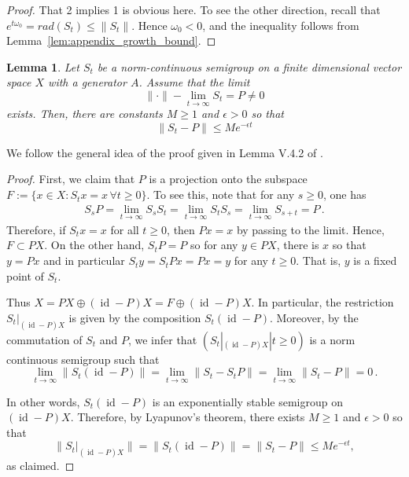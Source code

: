 \documentclass{article}
\DeclareMathOperator{\id}{id}
\newcommand{\<}{\langle}
\renewcommand{\>}{\rangle}
\numberwithin{equation}{section}
\newtheorem{lem}[thm]{Lemma}
\theoremstyle{definition}
\begin{document}
\begin{proof} 
	That 2 implies 1 is obvious here. To see the other direction, recall that $e^{t\omega_0} = rad(S_t) \le \|S_t\|$. Hence $\omega_0<0$, and the inequality follows from Lemma~\ref{lem:appendix_growth_bound}.
\end{proof}

\begin{lem}\label{lem:exp_decay}
	Let $S_t$ be a norm-continuous semigroup on a finite dimensional vector space $X$ with a generator $A$. Assume that the limit
		\begin{equation}
			\|\cdot \|-\lim_{t\to \infty} S_t = P \neq 0
		\end{equation} exists. Then, there are constants $M\ge 1$ and $\epsilon >0$ so that 
		\begin{equation}
			\|S_t - P\| \le M e^{-\epsilon t}
		\end{equation}
\end{lem}

	We follow the general idea of the proof given in Lemma V.4.2 of \cite{EngelNagel_Short}. 
\begin{proof}
	First, we claim that $P$ is a projection onto the subspace $F:=\{x\in X \colon S_tx = x \, \forall t\ge 0\}$. To see this, note that for any $s\ge 0$, one has 
	\begin{align*}
		S_s P = \lim_{t\to \infty} S_s S_t = \lim_{t\to \infty} S_{t}S_s = \lim_{t\to \infty} S_{s+t} = P\,.
	\end{align*} Therefore, if $S_tx = x$ for all $t\ge 0$, then $Px = x$ by passing to the limit. Hence, $F\subset PX$. On the other hand, $S_tP = P$ so for any $y\in PX$, there is $x$ so that $y= Px$ and in particular $S_t y = S_t Px = Px = y$ for any $t\ge 0$. That is, $y$ is a fixed point of $S_t$. 
	
	Thus $X = PX \oplus (\id - P)X = F\oplus (\id-P)X$. In particular, the restriction $S_t|_{(\id-P)X}$ is given by the composition $S_t(\id - P)$. Moreover, by the commutation of $S_t$ and $P$, we infer that  $(S_t|_{(\id - P)X} | t\ge 0)$ is a norm continuous semigroup such that \[\lim_{t\to \infty} \|S_t(\id-P)\| = \lim_{t\to \infty} \|S_t - S_t P\| = \lim_{t\to \infty} \|S_t - P\| = 0\,.\] 
	
	In other words, $S_t(\id - P)$ is an exponentially stable semigroup on $(\id - P)X$. Therefore, by Lyapunov's theorem, there exists $M\ge 1$ and $\epsilon >0$ so that \begin{equation}
		\|S_t|_{(\id - P)X}\|=\|S_t(\id-P)\| = \|S_t - P\| \le Me^{-\epsilon t},
	\end{equation} as claimed.
\end{proof}
\end{document}
